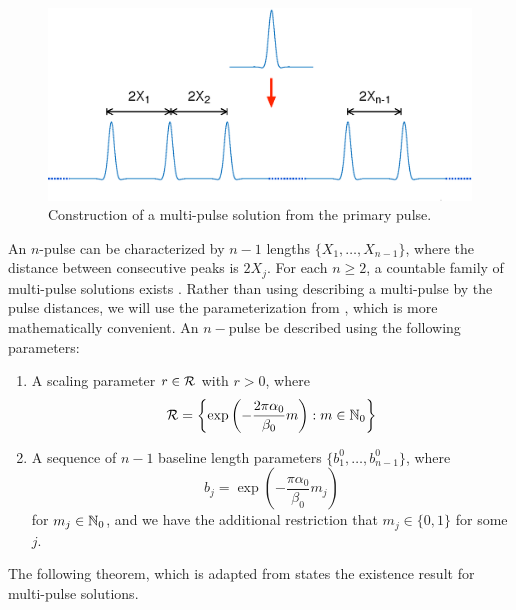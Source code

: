 \documentclass[thesis.tex]{subfiles}
\begin{document}
\begin{figure}[H]
\includegraphics[width=12cm]{images/kdv5numerics/multipulse.eps}
\caption{Construction of a multi-pulse solution from the primary pulse.}
\label{fig:multipulsediag}
\end{figure}

An $n$-pulse can be characterized by $n-1$ lengths $\{ X_1, \dots, X_{n-1} \}$, where the distance between consecutive peaks is $2 X_j$. For each $n \geq 2$, a countable family of multi-pulse solutions exists \cite{Buffoni1996,SandstedeStrut}. Rather than using describing a multi-pulse by the pulse distances, we will use the parameterization from \cite{SandstedeStrut}, which is more mathematically convenient. An $n-$pulse be described using the following parameters:
\begin{enumerate}
\item A scaling parameter $r \in \mathcal{R}$ with $r > 0$, where
\[
\mathcal{R} = \left\{ \mathop\mathrm{exp}\nolimits\left(-\frac{2 \pi \alpha_0}{\beta_0}m \right) : m \in \mathbb{N}_0 \right\}
\]
\item A sequence of $n-1$ baseline length parameters $\{ b_1^0, \dots, b_{n-1}^0 \}$, where 
\[
b_j = \exp\left(-\frac{\pi \alpha_0}{\beta_0}m_j \right)
\]
for $m_j \in \mathbb{N}_0$, and we have the additional restriction that $m_j \in \{0, 1\}$ for some $j$.
\end{enumerate}

The following theorem, which is adapted from \cite[Theorem 3.6]{SandstedeStrut} states the existence result for multi-pulse solutions.
\end{document}
